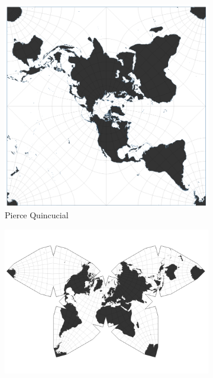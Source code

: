 \begin{figure}[H]
     \centering
      \begin{subfigure}[b]{.25\textwidth}
         \centering
     \includegraphics[width=\textwidth]{figures_c1/layout/pierce.png} \caption{Pierce Quincucial}
     \end{subfigure}
    \begin{subfigure}[b]{.3\textwidth}
         \centering
     \includegraphics[width=\textwidth]{figures_c1/layout/waterman_butterfly.png}

\end{subfigure}
\end{figure}
